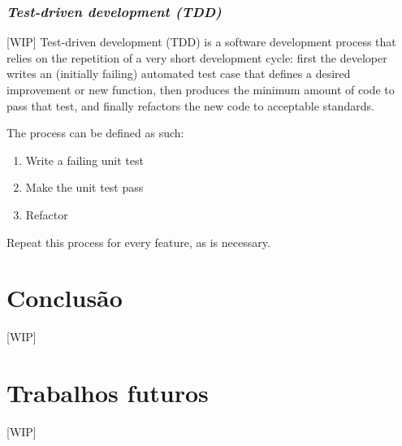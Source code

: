 \documentclass[12pt]{article}
\begin{document}
\section{\textsl{Test-driven development (TDD)}} \label{sec:tdd}
[WIP]
Test-driven development (TDD) is a software development process that relies on the repetition of a very short development cycle: first the developer writes an (initially failing) automated test case that defines a desired improvement or new function, then produces the minimum amount of code to pass that test, and finally refactors the new code to acceptable standards.

The process can be defined as such:
\begin{enumerate}
	\item Write a failing unit test
	\item Make the unit test pass
	\item Refactor
\end{enumerate}
  

Repeat this process for every feature, as is necessary.

\part{Conclusão} \label{sec:conclusao}
[WIP]

\part{Trabalhos futuros} \label{sec:trabalhos_futuros}
[WIP]



\end{document}
